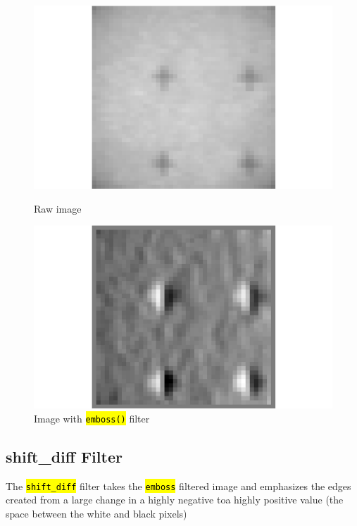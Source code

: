 \documentclass[10pt]{article}
\begin{document}
    \begin{figure}[h]
        \begin{minipage}{0.4\textwidth}
            \begin{center}
            \includegraphics[width=.75\linewidth]{plots_tables_images/untouched.png}
            \caption{Raw image}
            \end{center}
        \end{minipage}
        \begin{minipage}{0.4\textwidth}
            \begin{center}
            \includegraphics[width=.75\linewidth]{plots_tables_images/emboss.png}
            \caption{Image with \hl{\texttt{emboss()}} filter}
            \end{center}
        \end{minipage}
    \end{figure}

    \subsection{shift\_diff Filter}
    \label{sub:shift_diff_filter}
    The \hl{\texttt{shift\_diff}} filter takes the \hl{\texttt{emboss}} filtered image and emphasizes the edges created from a large change in a highly negative toa highly positive value (the space between the white and black pixels)
\end{document}
